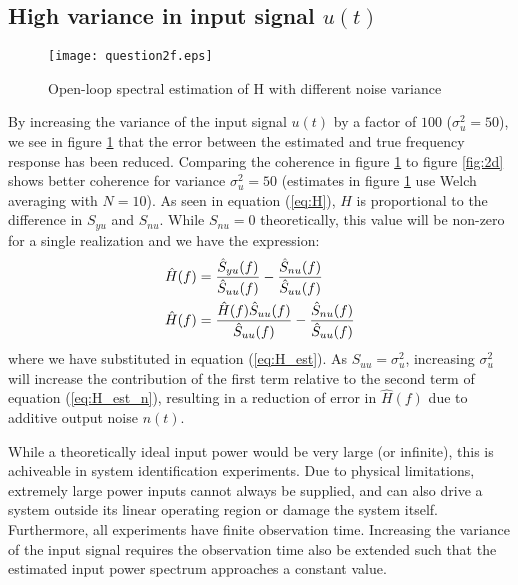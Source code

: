 \documentclass[11pt,a4paper]{article}
\begin{document}
\subsection{High variance in input signal $u(t)$}
\begin{figure}
    \begin{center}
        \texttt{[image: question2f.eps]}
    \end{center}
    \caption{Open-loop spectral estimation of H with different noise variance}
    \label{fig:2f}
\end{figure}
By increasing the variance of the input signal $u(t)$ by a factor of $100$
($\sigma_u^2 = 50$), we see in figure \ref{fig:2f} that the error between the
estimated and true frequency response has been reduced. Comparing the coherence
in figure \ref{fig:2f} to figure \ref{fig:2d} shows better coherence for
variance $\sigma_u^2 = 50$ (estimates in figure \ref{fig:2f} use Welch
averaging with $N = 10$). As seen in equation (\ref{eq:H}), $H$ is proportional
to the difference in $S_{yu}$ and $S_{nu}$. While $S_{nu} = 0$ theoretically,
this value will be non-zero for a single realization and we have the
expression:
\begin{align}
    \hat{H}(f) &= \frac{\hat{S}_{yu}(f)}{\hat{S}_{uu}(f)}  -
    \frac{\hat{S}_{nu}(f)}{\hat{S}_{uu}(f)} \notag\\
    \hat{H}(f) &= \frac{\hat{H}(f)\hat{S}_{uu}(f)}{\hat{S}_{uu}(f)}  -
    \frac{\hat{S}_{nu}(f)}{\hat{S}_{uu}(f)}
    \label{eq:H_est_n}
\end{align}
where we have substituted in equation (\ref{eq:H_est}). As $S_{uu} =
\sigma_u^2$, increasing $\sigma_u^2$ will increase the contribution of the
first term relative to the second term of equation (\ref{eq:H_est_n}),
resulting in a reduction of error in $\hat{H}(f)$ due to additive output noise
$n(t)$.

While a theoretically ideal input power would be very large (or infinite), this
is achiveable in system identification experiments. Due to physical
limitations, extremely large power inputs cannot always be supplied, and can
also drive a system outside its linear operating region or damage the system
itself. Furthermore, all experiments have finite observation time. Increasing
the variance of the input signal requires the observation time also be extended
such that the estimated input power spectrum approaches a constant value.

\end{document}
